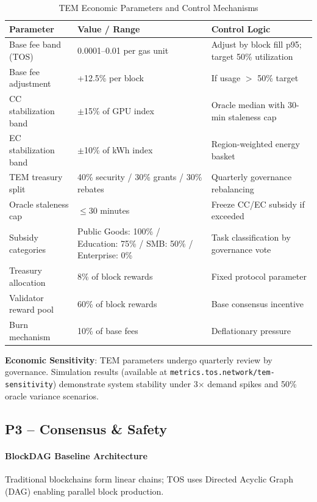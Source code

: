 \documentclass[11pt]{article}
\begin{document}
\begin{itemize}[noitemsep]
\begin{itemize}[noitemsep]
\begin{table}[H]
\centering
\caption{TEM Economic Parameters and Control Mechanisms}
\label{tab:tem-parameters}
\begin{tabular}{@{}p{}p{}p{}@{}}
\toprule
\textbf{Parameter} & \textbf{Value / Range} & \textbf{Control Logic} \\ \midrule
Base fee band (TOS) & 0.0001--0.01 per gas unit & Adjust by block fill p95; target 50\% utilization \\
Base fee adjustment & +12.5\% per block & If usage $>$ 50\% target \\
CC stabilization band & $\pm$15\% of GPU index & Oracle median with 30-min staleness cap \\
EC stabilization band & $\pm$10\% of kWh index & Region-weighted energy basket \\
TEM treasury split & 40\% security / 30\% grants / 30\% rebates & Quarterly governance rebalancing \\
Oracle staleness cap & $\le$30 minutes & Freeze CC/EC subsidy if exceeded \\
Subsidy categories & Public Goods: 100\% / Education: 75\% / SMB: 50\% / Enterprise: 0\% & Task classification by governance vote \\
Treasury allocation & 8\% of block rewards & Fixed protocol parameter \\
Validator reward pool & 60\% of block rewards & Base consensus incentive \\
Burn mechanism & 10\% of base fees & Deflationary pressure \\
\bottomrule
\end{tabular}
\end{table}

\textbf{Economic Sensitivity}: TEM parameters undergo quarterly review by governance. Simulation results (available at \texttt{metrics.tos.network/tem-sensitivity}) demonstrate system stability under 3$\times$ demand spikes and 50\% oracle variance scenarios.

\subsection{P3 -- Consensus \& Safety}
\label{sec:pillar-consensus}

\paragraph{BlockDAG Baseline Architecture}
Traditional blockchains form linear chains; TOS uses Directed Acyclic Graph (DAG) enabling parallel block production.


\end{itemize}
\end{itemize}
\end{document}
